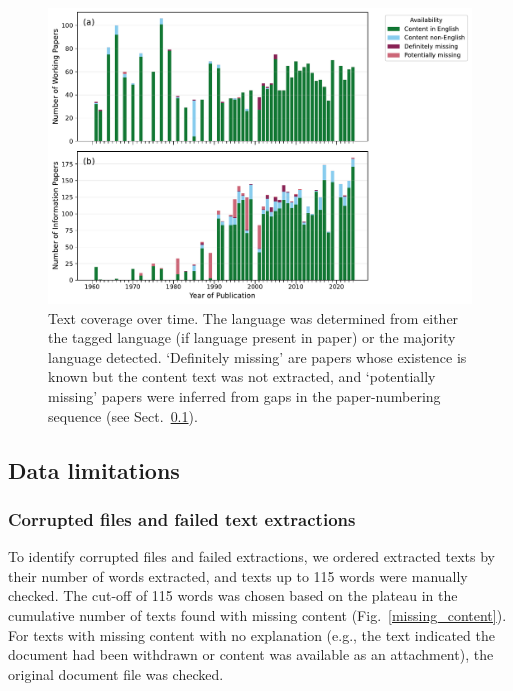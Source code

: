 \documentclass[12pt]{article}
\begin{document}
\begin{figure}[h]
    \includegraphics[width=\textwidth]{../results_describe_data/coverage_v_year_combined.pdf}
    \caption{
        Text coverage over time.
        The language was determined from either the tagged language 
        (if language present in paper)
        or the majority language detected.
        `Definitely missing' are papers 
        whose existence is known
        but the content text was not extracted,
        and `potentially missing' papers 
        were inferred from gaps in the paper-numbering
        sequence (see Sect.~\ref{S:data_limitations}).
    } \label{coverage_v_year_combined}
\end{figure}

\clearpage
\subsection{Data limitations}
\label{S:data_limitations}

\subsubsection{Corrupted files and failed text extractions}

To identify corrupted files and failed extractions,
we ordered extracted texts by their number of words extracted,
and texts up to 115 words were manually checked.
The cut-off of 115 words was chosen based on the plateau
in the cumulative number of texts found with missing content
(Fig.~\ref{missing_content}).
For texts with missing content with no explanation
(e.g., the text indicated the document had been withdrawn
or content was available as an attachment),
the original document file was checked.
\end{document}

